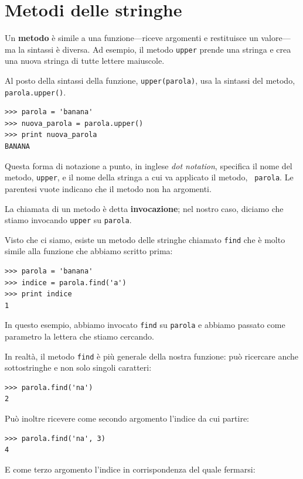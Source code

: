 \documentclass[10pt]{book}
\begin{document}
\section{Metodi delle stringhe}

Un {\bf metodo} è simile a una funzione---riceve argomenti e restituisce un valore---ma la sintassi è diversa. Ad esempio, il metodo {\tt upper} prende una stringa e crea una nuova stringa di tutte lettere maiuscole.

Al posto della sintassi della funzione, {\tt upper(parola)}, usa la sintassi del metodo, {\tt parola.upper()}.

\begin{verbatim}
>>> parola = 'banana'
>>> nuova_parola = parola.upper()
>>> print nuova_parola
BANANA
\end{verbatim}
%
Questa forma di notazione a punto, in inglese {\em dot notation}, specifica il nome del metodo, {\tt upper}, e il nome della stringa a cui va applicato il metodo, {\tt
parola}. Le parentesi vuote indicano che il metodo non ha argomenti.

La chiamata di un metodo è detta {\bf invocazione}; nel nostro caso, diciamo che stiamo invocando {\tt upper} su {\tt parola}.

Visto che ci siamo, esiste un metodo delle stringhe chiamato {\tt find} che è molto simile alla funzione che abbiamo scritto prima:

\begin{verbatim}
>>> parola = 'banana'
>>> indice = parola.find('a')
>>> print indice
1
\end{verbatim}
%
In questo esempio, abbiamo invocato {\tt find} su {\tt parola} e abbiamo passato come parametro la lettera che stiamo cercando.

In realtà, il metodo {\tt find} è più generale della nostra funzione: può ricercare anche sottostringhe e non solo singoli caratteri:

\begin{verbatim}
>>> parola.find('na')
2
\end{verbatim}
%
Può inoltre ricevere come secondo argomento l'indice da cui partire:

\begin{verbatim}
>>> parola.find('na', 3)
4
\end{verbatim}
%
E come terzo argomento l'indice in corrispondenza del quale fermarsi:
\end{document}
